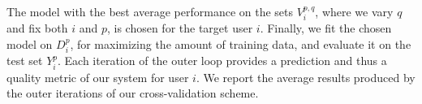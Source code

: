 \documentclass[letterpaper]{article} %
\theoremstyle{definition}
\newcommand{\argmax}[1]{\underset{#1}{\operatorname{arg}\,\operatorname{max}}\;}
\newcommand{\kibitz}[2]{\ifnum\Comments=1{\color{#1}{#2}}\fi}
\newcommand{\ym}[1]{\kibitz{blue}{[YM:#1]}}
\begin{document}
The model with the best average performance on the sets $V_i^{p,q}$, where we vary $q$ and fix both $i$ and $p$, is chosen for the target user $i$.
Finally, we fit the chosen model on $D_i^p$, for maximizing the amount of training data, and evaluate it on the test set $Y_i^p$.
Each iteration of the outer loop provides a prediction and thus a quality metric of our system for user $i$.
We report the average results produced by the outer iterations of our cross-validation scheme.

%
%


\end{document}
